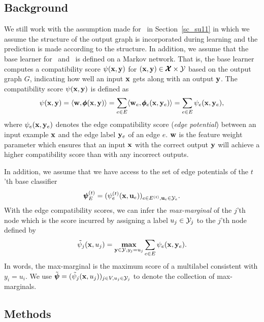 {%
%
\subsection{Background}

We still work with the assumption made for \mve\ in Section~\ref{sc_su11} in which we assume the structure of the output graph is incorporated during learning and the prediction is made according to the structure.
In addition, we assume that the base learner for \amm\ and \mam\ is defined on a Markov network.
That is, the base learner computes a compatibility score $\psi(\mathbf {x},\mathbf {y})$ for $(\mathbf {x},\mathbf {y})\in\pmb {\mathcal{X}}\times\mathcal{Y}$ based on the output graph $G$, indicating how well an input $\mathbf {x}$ gets along with an output $\mathbf {y}$.
The compatibility score $\psi(\mathbf {x},\mathbf {y})$ is defined as
\begin{align*}
	\psi(\mathbf {x},\mathbf {y}) = \langle \mathbf {w}, \pmb \phi(\mathbf {x},\mathbf {y}) \rangle = \sum_{e\in E}\langle \mathbf {w}_e, \pmb \phi_e(\mathbf {x},\mathbf {y}_e) \rangle=\sum_{e\in E}\psi_e(\mathbf {x},\mathbf {y}_e),
\end{align*}
where $\psi_e(\mathbf {x},\mathbf {y}_e)$ denotes the edge compatibility score (\textit{edge potential}) between an input example $\mathbf {x}$ and the edge label $\mathbf {y}_e$ of an edge $e$.
$\mathbf {w}$ is the feature weight parameter which ensures that an input $\mathbf {x}$ with the correct output $\mathbf {y}$ will achieve a higher compatibility score than with any incorrect outputs.

In addition, we assume that we have access to the set of edge potentials of the $t$'th base classifier 
\begin{align*}
	\pmb \psi_E^{(t)} = (\psi_e^{(t)}(\mathbf {x},\mathbf {u}_e))_{e\in E^{(t)},\mathbf {u}_e\in\mathcal{Y}_e}.
\end{align*}
With the edge compatibility scores, we can infer the \textit{max-marginal} \citep{Wainwright05map} of the $j$'th node which is the score incurred by assigning a label $u_j\in\mathcal{Y}_j$ to the $j$'th node defined by
\begin{align*}
	\tilde{\psi}_j(\mathbf {x},u_j) = \underset{\mathbf {y}\in\mathcal{Y},y_j=u_j}{\textbf{max}}\sum_{e\in E}\psi_e(\mathbf {x},\mathbf {y}_e).
\end{align*}
In words, the max-marginal is the maximum score of a multilabel consistent with $y_i=u_i$.
We use $\tilde{\pmb \psi} = (\tilde{\psi}_j(\mathbf {x},u_j))_{j\in V,u_j\in\mathcal{Y}_j}$ to denote the collection of max-marginals.

\subsection{Methods}

}
